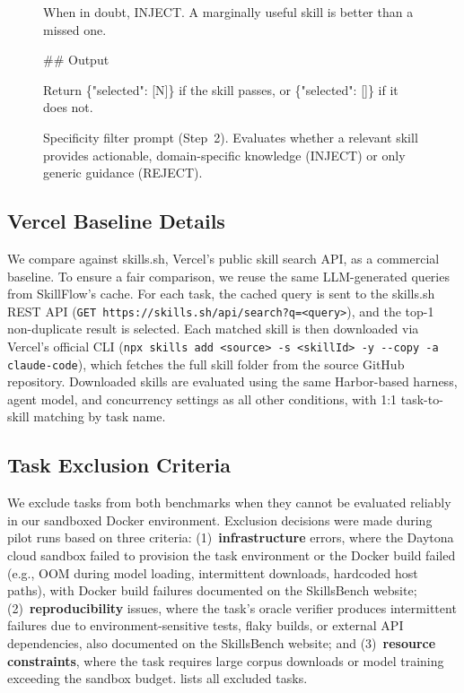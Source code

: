 \documentclass[11pt]{article}
\begin{document}
\begin{figure}[!p]
\begin{tcolorbox}[title=Selector Specificity Prompt (Step~2), colback=gray!5, colframe=gray!50, fonttitle=\bfseries\small, fontupper=\scriptsize\ttfamily\raggedright]
When in doubt, INJECT. A marginally useful skill is better than a missed one.\newline

\#\# Output\newline

Return \{"selected": [N]\} if the skill passes, or \{"selected": []\} if it does not.
\end{tcolorbox}
\caption{Specificity filter prompt (Step~2).
Evaluates whether a relevant skill provides actionable, domain-specific knowledge (INJECT) or only generic guidance (REJECT).}
\label{box:specificity_prompt}
\end{figure}

\subsection{Vercel Baseline Details}
\label{sec:vercel_details}

We compare against skills.sh, Vercel's public skill search API, as a commercial baseline.
To ensure a fair comparison, we reuse the same LLM-generated queries from SkillFlow's cache.
For each task, the cached query is sent to the skills.sh REST API (\texttt{GET https://skills.sh/api/search?q=<query>}), and the top-1 non-duplicate result is selected.
Each matched skill is then downloaded via Vercel's official CLI (\texttt{npx skills add <source> -s <skillId> -y {-}{-}copy -a claude-code}), which fetches the full skill folder from the source GitHub repository.
Downloaded skills are evaluated using the same Harbor-based harness, agent model, and concurrency settings as all other conditions, with 1:1 task-to-skill matching by task name.

\subsection{Task Exclusion Criteria}
\label{sec:task_exclusion}

We exclude tasks from both benchmarks when they cannot be evaluated reliably in our sandboxed Docker environment.
Exclusion decisions were made during pilot runs based on three criteria: (1)~\textbf{infrastructure} errors, where the Daytona cloud sandbox failed to provision the task environment or the Docker build failed (e.g., OOM during model loading, intermittent downloads, hardcoded host paths), with Docker build failures documented on the SkillsBench website; (2)~\textbf{reproducibility} issues, where the task's oracle verifier produces intermittent failures due to environment-sensitive tests, flaky builds, or external API dependencies, also documented on the SkillsBench website; and (3)~\textbf{resource constraints}, where the task requires large corpus downloads or model training exceeding the sandbox budget.
 lists all excluded tasks.
\end{document}
